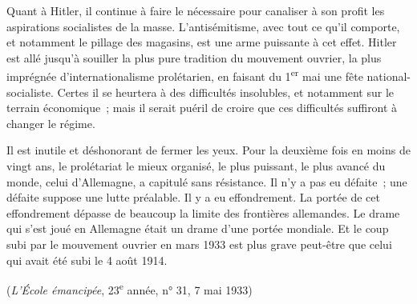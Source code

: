 \documentclass[french,twoside]{book} %
\begin{document}
Quant à Hitler, il continue à faire le nécessaire pour canaliser à son profit les aspirations socialistes de la masse. L'antisémitisme, avec tout ce qu'il comporte, et notamment le pillage des magasins, est une arme puissante à cet effet. Hitler est allé jusqu'à souiller la plus pure tradition du mouvement ouvrier, la plus imprégnée d'internationalisme prolétarien, en faisant du 1\textsuperscript{er} mai une fête national-socialiste. Certes il se heurtera à des difficultés insolu­bles, et notamment sur le terrain économique ; mais il serait puéril de croire que ces difficultés suffiront à changer le régime.\par
Il est inutile et déshonorant de fermer les yeux. Pour la deuxième fois en moins de vingt ans, le prolétariat le mieux organisé, le plus puissant, le plus avancé du monde, celui d'Allemagne, a capitulé sans résistance. Il n'y a pas eu défaite ; une défaite suppose une lutte préalable. Il y a eu effondrement. La portée de cet effondrement dépasse de beaucoup la limite des frontières allemandes. Le drame qui s'est joué en Allemagne était un drame d'une portée mondiale. Et le coup subi par le mouvement ouvrier en mars 1933 est plus grave peut-être que celui qui avait été subi le 4 août 1914.\par
({\itshape L'École émancipée}, 23\textsuperscript{e} année, n° 31, 7 mai 1933)\par
\end{document}
